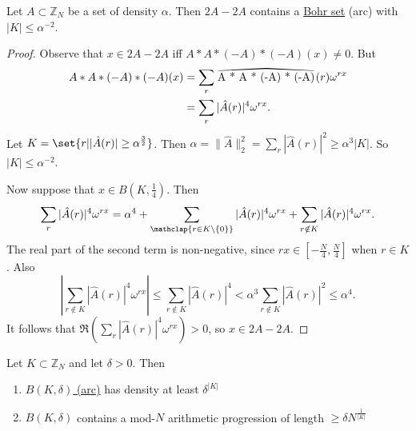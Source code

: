 \documentclass{article}
\newcommand\reallywidehat[1]{%
\savestack{\tmpbox}{\stretchto{%
  \scaleto{%
    \scalerel*[\widthof{\ensuremath{#1}}]{\kern.1pt\mathchar"0362\kern.1pt}%
    {\rule{0ex}{\textheight}}%
  }{\textheight}%
}{2.4ex}}%
\stackon[-6.9pt]{#1}{\tmpbox}%
}
\newcommand{\1}[1]{\mathbbm{1}_{#1}}
\begin{document}
\begin{nlemma}\label{lem:1.7}
  Let $A \subset \mathbb{Z}_N$ be a set of density $\alpha$.
  Then $2A - 2A$ contains a \hyperlink{def:bohr}{Bohr set} (arc) with $|K| \leq \alpha^{-2}$.
\end{nlemma}
\begin{proof}
  Observe that $x \in 2A - 2A$ iff $A * A * (-A) * (-A)(x) \neq 0$.
  But
  \begin{align*}
    A * A * (-A) * (-A) (x) &= \sum_r \reallywidehat{A * A * (-A) * (-A)} (r) \omega^{r x} \\
                            &= \sum_r |\hat{A}(r)|^4 \omega^{r x}.
  \end{align*}
  Let $K = \set{r | |\hat{A}(r)| \geq \alpha^\frac{3}{2}}$.
  Then $\alpha = \|\hat{A}\|^2_2 = \sum_r |\hat{A}(r)|^2 \geq \alpha^3 |K|$.
  So $|K| \leq \alpha^{-2}$.

  Now suppose that $x \in B(K, \frac{1}{4})$.
  Then
  \begin{align*}
    \sum_r |\hat{A}(r)|^4 \omega^{r x} = \alpha^4 + \sum_{\mathclap{r \in K \setminus \{0\}}} |\hat{A}(r)|^4 \omega^{rx} + \sum_{r \notin K} |\hat{A}(r)|^4 \omega^{r x}.
  \end{align*}
  The real part of the second term is non-negative, since $r x \in \left[-\frac{N}{4}, \frac{N}{4}\right]$ when $r \in K$.
  Also
  \begin{equation*}
    \left|\sum_{r \notin K} |\hat{A}(r)|^4 \omega^{r x}\right| \leq \sum_{r \notin K} |\hat{A}(r)|^4 < \alpha^3 \sum_{r \notin K} |\hat{A}(r)|^2 \leq \alpha^4.
  \end{equation*}
  It follows that $\Re \left(\sum_r |\hat{A}(r)|^4 \omega^{r x}\right) > 0$, so $x \in 2A - 2A$.
\end{proof}
\begin{nlemma}\label{lem:1.8}
  Let $K \subset \mathbb{Z}_N$ and let $\delta > 0$. Then
  \begin{enumerate}[label=(\roman*)]
    \item \hyperlink{def:bohr}{$B(K, \delta)$ (arc)} has density at least $\delta^{|K|}$
    \item $B(K, \delta)$ contains a mod-$N$ arithmetic progression of length $\geq \delta N^\frac{1}{|K|}$
  \end{enumerate}
\end{nlemma}
\end{document}
